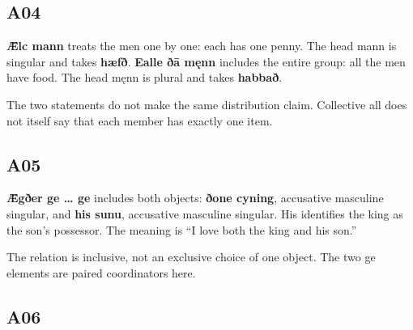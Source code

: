 \subsection*{A04}

\par\begin{minipage}{\linewidth}\raggedright
\textbf{Ǣlc mann} treats the men one by one: each has one penny. The head mann is singular and takes \textbf{hæfð}. \textbf{Ealle ðā męnn} includes the entire group: all the men have food. The head męnn is plural and takes \textbf{habbað}.

The two statements do not make the same distribution claim. Collective all does not itself say that each member has exactly one item.

\end{minipage}\par\addvspace{4pt}

\subsection*{A05}

\par\begin{minipage}{\linewidth}\raggedright
\textbf{Ǣgðer ge … ge} includes both objects: \textbf{ðone cyning}, accusative masculine singular, and \textbf{his sunu}, accusative masculine singular. His identifies the king as the son’s possessor. The meaning is “I love both the king and his son.”

The relation is inclusive, not an exclusive choice of one object. The two ge elements are paired coordinators here.

\end{minipage}\par\addvspace{4pt}

\subsection*{A06}

